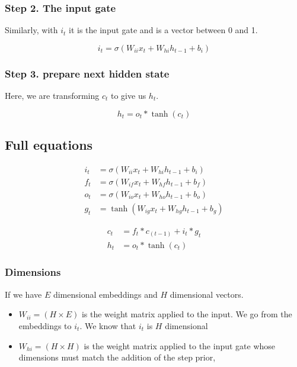 \documentclass[11pt]{article}
\begin{document}
\subsubsection{Step 2. The input gate}

Similarly, with $i_t$ it is the input gate and is a vector between 0 and 1.

\begin{equation*}
    i_t = \sigma (W_{ii}x_t + W_{hi}h_{t-1}+b_i)
\end{equation*}

\subsubsection{Step 3. prepare next hidden state}

Here, we are transforming $c_t$ to give us $h_t$. 

\begin{equation*}
    h_t = o_t \ast \tanh(c_t) 
\end{equation*}

\subsection{Full equations}

\begin{align*}
    i_t & = \sigma (W_{ii}x_t + W_{hi}h_{t-1}+b_i) \\
    f_t & = \sigma (W_{if}x_t + W_{hf}h_{t-1}+b_f) \\
    o_t & = \sigma (W_{io}x_t + W_{ho}h_{t-1}+b_o) \\
    g_t & = \tanh(W_{ig}x_t + W_{hg}h_{t-1}+b_g)
\end{align*}

\begin{align*}
    c_t & = f_t \ast c_{(t-1)} + i_t \ast g_t \\
    h_t & = o_t \ast \tanh(c_t)
\end{align*}

\subsubsection{Dimensions}

If we have $E$ dimensional embeddings and $H$ dimensional vectors.

\begin{itemize}
    \item $W_{ii}=(H\times E)$ is the weight matrix applied to the input. We go from the embeddings to $i_t$. We know that $i_t$ is $H$ dimensional 
    \item $W_{hi}=(H\times H)$ is the weight matrix applied to the input gate whose dimensions must match the addition of the step prior, 
\end{itemize}
\end{document}
